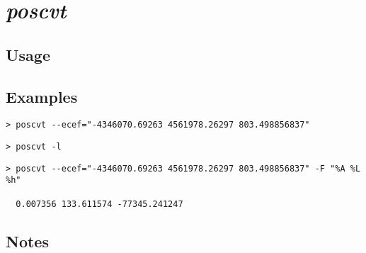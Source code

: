 \section{\emph{poscvt}}
\subsection{Usage}
\subsection{Examples}
\begin{verbatim}
> poscvt --ecef="-4346070.69263 4561978.26297 803.498856837"
\end{verbatim}
\begin{verbatim}
> poscvt -l
\end{verbatim}
\begin{verbatim}
> poscvt --ecef="-4346070.69263 4561978.26297 803.498856837" -F "%A %L %h"

  0.007356 133.611574 -77345.241247
\end{verbatim}
\subsection{Notes}

